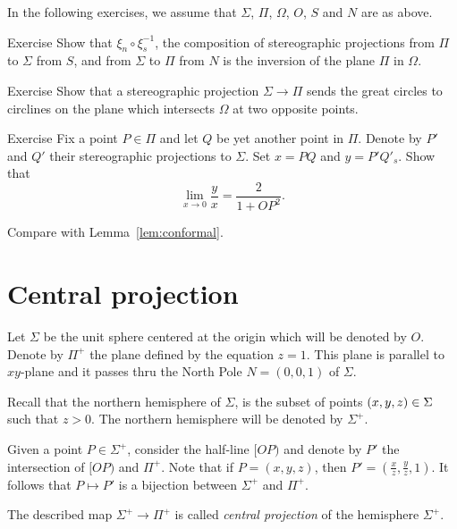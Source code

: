 In the following exercises,
we assume that $\Sigma$, $\Pi$, $\Omega$, $O$, $S$ and $N$ are as above.
  
\begin{thm}{Exercise}\label{ex:two-stereographics}
Show that $\xi_n \circ \xi^{-1}_s$, the composition of stereographic projections 
from $\Pi$ to $\Sigma$ from  $S$, and
from $\Sigma$ to $\Pi$ from  $N$ is 
the inversion of the plane $\Pi$ in $\Omega$.
\end{thm}

\begin{thm}{Exercise}\label{ex:great-circ}
Show that  a stereographic projection $\Sigma\to\Pi$
sends the great circles to circlines on the plane which intersects $\Omega$ at two opposite points.
\end{thm}

\begin{thm}{Exercise}\label{ex:conform-sphere}
Fix a point $P\in \Pi$  and let $Q$ be yet another point in $\Pi$.
Denote by $P'$ and $Q'$ their stereographic projections to $\Sigma$.
Set $x=PQ$ and $y=P'Q'_s$.
Show that
$$\lim_{x\to 0} \frac{y}{x}=\frac{2}{1+OP^2}.$$

Compare with Lemma~\ref{lem:conformal}.
\end{thm}



\section*{Central projection}

Let $\Sigma$ be the unit sphere centered at the origin which will be denoted by $O$.
Denote by $\Pi^+$ the plane defined by the equation $z=1$.
This plane is parallel to $xy$-plane and it passes thru 
the North Pole $N=(0,0,1)$ of $\Sigma$.

Recall that the northern hemisphere of $\Sigma$,
is the subset of points $(x,y,z)\z\in \Sigma$ such that $z>0$.
The northern  hemisphere will be denoted by $\Sigma^+$.

Given a point $P\in \Sigma^+$, consider the  
half-line $[OP)$ and denote by $P'$ the intersection of $[OP)$ and $\Pi^+$.
Note that 
if $P=(x,y,z)$, then $P'=(\tfrac xz,\tfrac yz,1)$.
It follows that $P\mapsto P'$ is a bijection between $\Sigma^+$ and $\Pi^+$.

The described map $\Sigma^+\to \Pi^+$ is called \emph{central projection} of 
the hemisphere $\Sigma^+$.

